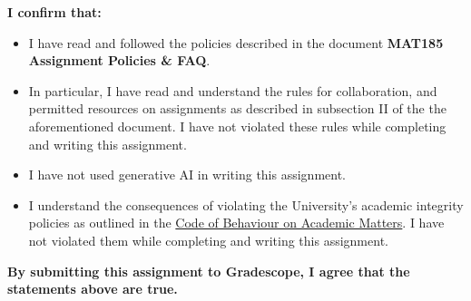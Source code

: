 \documentclass[10pt,answers]{exam}
\begin{document}

\bigskip
\large \textbf{I confirm that:}
\normalsize

\begin{itemize} 
\item I have read and followed the policies described in the document {\bf
    MAT185 Assignment Policies \& FAQ}.
\item In particular, I have read and understand the rules for
  collaboration, and permitted resources on assignments as described in
  subsection II of the the aforementioned document. I have not violated
  these rules while completing and writing this assignment.
\item I have not used generative AI in writing this assignment.
\item I understand the consequences of violating the University's academic
  integrity policies as outlined in the
  \href{http://www.governingcouncil.utoronto.ca/policies/behaveac.htm}{Code of
    Behaviour on Academic Matters}. I have not violated them while completing
  and writing this assignment.
\end{itemize}
\bigskip

\large \textbf{By submitting this assignment to Gradescope, I agree that the
  statements above are true.}  \normalsize

\newpage
\end{document}
